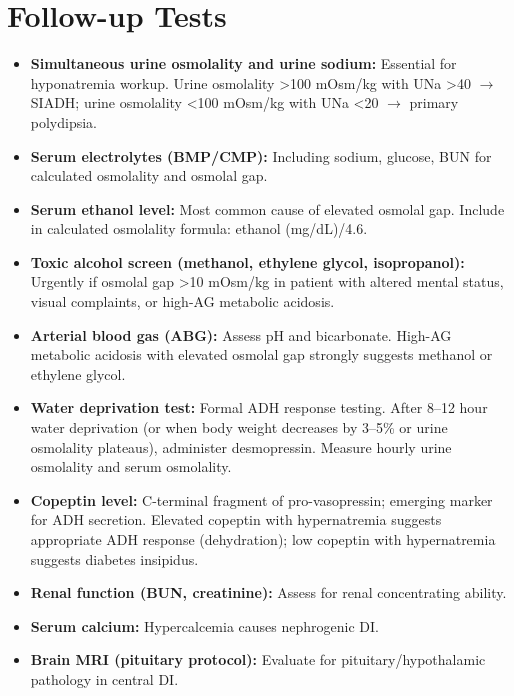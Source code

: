 \section*{Follow-up Tests}
\begin{itemize}
  \item \textbf{Simultaneous urine osmolality and urine sodium:} Essential for hyponatremia workup. Urine osmolality >100 mOsm/kg with UNa >40 $\rightarrow$ SIADH; urine osmolality <100 mOsm/kg with UNa <20 $\rightarrow$ primary polydipsia.
  \item \textbf{Serum electrolytes (BMP/CMP):} Including sodium, glucose, BUN for calculated osmolality and osmolal gap.
  \item \textbf{Serum ethanol level:} Most common cause of elevated osmolal gap. Include in calculated osmolality formula: ethanol (mg/dL)/4.6.
  \item \textbf{Toxic alcohol screen (methanol, ethylene glycol, isopropanol):} Urgently if osmolal gap >10 mOsm/kg in patient with altered mental status, visual complaints, or high-AG metabolic acidosis.
  \item \textbf{Arterial blood gas (ABG):} Assess pH and bicarbonate. High-AG metabolic acidosis with elevated osmolal gap strongly suggests methanol or ethylene glycol.
  \item \textbf{Water deprivation test:} Formal ADH response testing. After 8--12 hour water deprivation (or when body weight decreases by 3--5\% or urine osmolality plateaus), administer desmopressin. Measure hourly urine osmolality and serum osmolality.
  \item \textbf{Copeptin level:} C-terminal fragment of pro-vasopressin; emerging marker for ADH secretion. Elevated copeptin with hypernatremia suggests appropriate ADH response (dehydration); low copeptin with hypernatremia suggests diabetes insipidus.
  \item \textbf{Renal function (BUN, creatinine):} Assess for renal concentrating ability.
  \item \textbf{Serum calcium:} Hypercalcemia causes nephrogenic DI.
  \item \textbf{Brain MRI (pituitary protocol):} Evaluate for pituitary/hypothalamic pathology in central DI.
\end{itemize}

